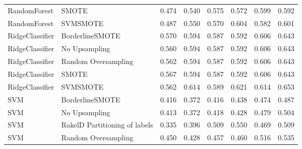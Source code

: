\begin{tabular}{llllllll}
                   RandomForest &                         SMOTE & 0.474 &                     0.540 &                 0.575 &                  0.572 &                                   0.599 &    0.592 \\
                   RandomForest &                      SVMSMOTE & 0.487 &                     0.550 &                 0.570 &                  0.604 &                                   0.582 &    0.601 \\
                RidgeClassifier &               BorderlineSMOTE & 0.570 &                     0.594 &                 0.587 &                  0.592 &                                   0.606 &    0.643 \\
                RidgeClassifier &                 No Upsampling & 0.560 &                     0.594 &                 0.587 &                  0.592 &                                   0.606 &    0.643 \\
                RidgeClassifier &           Random Oversampling & 0.562 &                     0.594 &                 0.587 &                  0.592 &                                   0.606 &    0.643 \\
                RidgeClassifier &                         SMOTE & 0.567 &                     0.594 &                 0.587 &                  0.592 &                                   0.606 &    0.643 \\
                RidgeClassifier &                      SVMSMOTE & 0.562 &                     0.614 &                 0.589 &                  0.621 &                                   0.614 &    0.653 \\
                            SVM &               BorderlineSMOTE & 0.416 &                     0.372 &                 0.416 &                  0.438 &                                   0.474 &    0.487 \\
                            SVM &                 No Upsampling & 0.413 &                     0.372 &                 0.418 &                  0.428 &                                   0.479 &    0.504 \\
                            SVM & RakelD Partitioning of labels & 0.335 &                     0.396 &                 0.509 &                  0.550 &                                   0.469 &    0.509 \\
                            SVM &           Random Oversampling & 0.450 &                     0.428 &                 0.457 &                  0.460 &                                   0.516 &    0.535 \\

\end{tabular}
